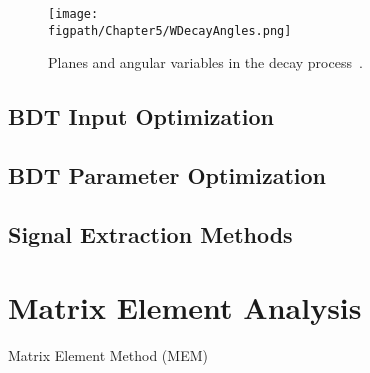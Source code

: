 \begin{figure}[!hbt]
    \centering
    \texttt{[image: \\figpath/Chapter5/WDecayAngles.png]}
    \caption{Planes and angular variables in the \HWWlvqq decay process~\cite{PhysRevD.81.075022}.}
    \label{fig:XWWDecayAngles}
\end{figure}






























































\subsection{BDT Input Optimization}
\label{sec:BDT_input_optimization}
\subsection{BDT Parameter Optimization}
\label{sec:BDT_parameter_optimization}
\subsection{Signal Extraction Methods}

\section{Matrix Element Analysis}
Matrix Element Method (MEM)

